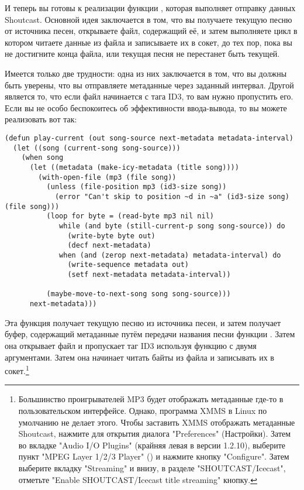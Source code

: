 И теперь вы готовы к реализации функции , которая выполняет отправку
данных Shoutcast.  Основной идея заключается в том, что вы получаете текущую песню от
источника песен, открываете файл, содержащий её, и затем выполняете цикл в котором читаете
данные из файла и записываете их в сокет, до тех пор, пока вы не достигните конца файла,
или текущая песня не перестанет быть текущей.

Имеется только две трудности: одна из них заключается в том, что вы должны быть уверены,
что вы отправляете метаданные через заданный интервал.  Другой является то, что если файл
начинается с тага ID3, то вам нужно пропустить его.  Если вы не особо беспокоитесь об
эффективности ввода-вывода, то вы можете реализовать  вот так:

\begin{lstlisting}
(defun play-current (out song-source next-metadata metadata-interval)
  (let ((song (current-song song-source)))
    (when song
      (let ((metadata (make-icy-metadata (title song))))
        (with-open-file (mp3 (file song))
          (unless (file-position mp3 (id3-size song))
            (error "Can't skip to position ~d in ~a" (id3-size song) (file song)))
          (loop for byte = (read-byte mp3 nil nil)
             while (and byte (still-current-p song song-source)) do
               (write-byte byte out)
               (decf next-metadata)
             when (and (zerop next-metadata) metadata-interval) do
               (write-sequence metadata out)
               (setf next-metadata metadata-interval))

          (maybe-move-to-next-song song song-source)))
      next-metadata)))
\end{lstlisting}

Эта функция получает текущую песню из источника песен, и затем получает буфер, содержащий
метаданные путём передачи названия песни функции .  Затем она
открывает файл и пропускает таг ID3 используя функцию  с двумя
аргументами.  Затем она начинает читать байты из файла и записывать их в
сокет.\footnote{Большинство проигрывателей MP3 будет отображать метаданные где-то в
  пользовательском интерфейсе.  Однако, программа XMMS в Linux по умолчанию не делает
  этого. Чтобы заставить XMMS отображать метаданные Shoutcast, нажмите  для
  открытия диалога "Preferences" (Настройки).  Затем во вкладке "Audio I/O Plugins"
  (крайняя левая в версии 1.2.10), выберите пункт "MPEG Layer 1/2/3 Player"
  () и нажмите кнопку "Configure".  Затем выберите вкладку "Streaming"
  и внизу, в разделе "SHOUTCAST/Icecast", отметьте "Enable SHOUTCAST/Icecast title
  streaming" кнопку.}

